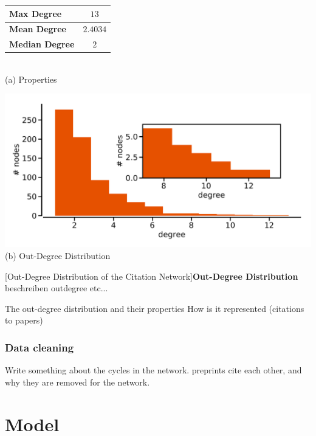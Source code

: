 \begin{minipage}{\textwidth}
  \begin{minipage}[b]{0.39\textwidth}
    \centering
    \begin{tabular}{ l c }
      \toprule
      \textbf{Max Degree}    & $13$     \\ \midrule
      \textbf{Mean Degree}   & $2.4034$ \\ \midrule
      \textbf{Median Degree} & $2$      \\
      \bottomrule
  \end{tabular} \\
  \vspace*{1cm}
  (a) Properties
\end{minipage}
\begin{minipage}[b]{0.59\textwidth}
  \centering
  \includegraphics[width=1.0\textwidth]{figures/out-degree_distribution} \\
  (b) Out-Degree Distribution
  \end{minipage}
  [Out-Degree Distribution of the Citation Network]{\textbf{Out-Degree Distribution} beschreiben outdegree etc...}
  \label{fig:indegree_distribution}
\end{minipage}

The out-degree distribution and their properties How is it represented (citations to papers)

\subsubsection{Data cleaning}
\label{subsubsec:data_cleaning}
Write something about the cycles in the network. preprints cite each other, and why they are removed for the network.

\section{Model}
\label{sec:model}

